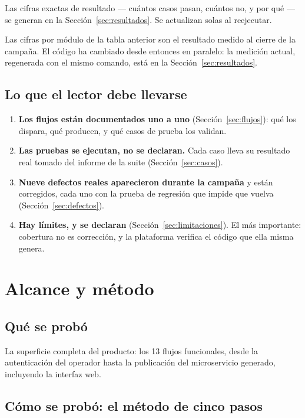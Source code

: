 \documentclass[11pt,a4paper]{article}
\begin{document}
\noindent
Las cifras exactas de resultado --- cuántos casos pasan, cuántos no, y por qué --- se generan
en la Sección~\ref{sec:resultados}. Se actualizan solas al reejecutar.

\noindent
Las cifras por módulo de la tabla anterior son el resultado medido al cierre de la campaña. El código ha cambiado desde entonces en paralelo: la medición actual, regenerada con el mismo comando, está en la Sección~\ref{sec:resultados}.

\subsection*{Lo que el lector debe llevarse}

\begin{enumerate}[leftmargin=1.6em]
\item \textbf{Los flujos están documentados uno a uno} (Sección~\ref{sec:flujos}): qué los
      dispara, qué producen, y qué casos de prueba los validan.
\item \textbf{Las pruebas se ejecutan, no se declaran.} Cada caso lleva su resultado real
      tomado del informe de la suite (Sección~\ref{sec:casos}).
\item \textbf{Nueve defectos reales aparecieron durante la campaña} y están corregidos, cada
      uno con la prueba de regresión que impide que vuelva (Sección~\ref{sec:defectos}).
\item \textbf{Hay límites, y se declaran} (Sección~\ref{sec:limitaciones}). El más importante:
      cobertura no es corrección, y la plataforma verifica el código que ella misma genera.
\end{enumerate}

\section{Alcance y método}
\label{sec:metodo}

\subsection{Qué se probó}

La superficie completa del producto: los 13 flujos funcionales, desde la autenticación del
operador hasta la publicación del microservicio generado, incluyendo la interfaz web.

\subsection{Cómo se probó: el método de cinco pasos}
\end{document}
